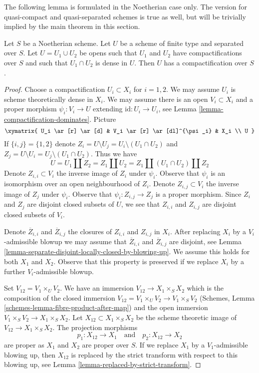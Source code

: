 \noindent
The following lemma is formulated in the Noetherian case only.
The version for quasi-compact and quasi-separated schemes is
true as well, but will be trivially implied by the main
theorem in this section.

\begin{lemma}
\label{lemma-two-compactifications}
Let $S$ be a Noetherian scheme. Let $U$ be a scheme of finite type
and separated over $S$. Let $U = U_1 \cup U_2$ be opens such that
$U_1$ and $U_2$ have compactifications over $S$ and such that
$U_1 \cap U_2$ is dense in $U$. Then $U$ has a compactification over $S$.
\end{lemma}

\begin{proof}
Choose a compactification $U_i \subset X_i$ for $i = 1, 2$. We may
assume $U_i$ is scheme theoretically dense in $X_i$. We may assume there
is an open $V_i \subset X_i$ and a proper morphism
$\psi_i : V_i \to U$ extending $\text{id} : U_i \to U_i$, see
Lemma \ref{lemma-compactification-dominates}. Picture
$$
\xymatrix{
U_i \ar[r] \ar[d] & V_i \ar[r] \ar[dl]^{\psi_i} & X_i \\
U
}
$$
If $\{i, j\} = \{1, 2\}$ denote
$Z_i = U \setminus U_j = U_i \setminus (U_1 \cap U_2)$
and
$Z_j = U \setminus U_i = U_j \setminus (U_1 \cap U_2)$.
Thus we have
$$
U = U_1 \amalg Z_2 = Z_1 \amalg U_2 = Z_1 \amalg (U_1 \cap U_2) \amalg Z_2
$$
Denote $Z_{i, i} \subset V_i$ the inverse image of $Z_i$ under $\psi_i$.
Observe that $\psi_i$ is an isomorphism over an open neighbourhood of $Z_i$.
Denote $Z_{i, j} \subset V_i$ the inverse image of $Z_j$ under $\psi_i$.
Observe that $\psi_i : Z_{i, j} \to Z_j$ is a proper morphism.
Since $Z_i$ and $Z_j$ are disjoint closed subsets of
$U$, we see that $Z_{i, i}$ and $Z_{i, j}$ are disjoint closed subsets
of $V_i$.

\medskip\noindent
Denote $\overline{Z}_{i, i}$ and $\overline{Z}_{i, j}$ the closures of
$Z_{i, i}$ and $Z_{i, j}$ in $X_i$. After replacing $X_i$ by a
$V_i$-admissible blowup we may assume that
$\overline{Z}_{i, i}$ and $\overline{Z}_{i, j}$ are disjoint, see
Lemma \ref{lemma-separate-disjoint-locally-closed-by-blowing-up}.
We assume this holds for both $X_1$ and $X_2$.
Observe that this property is preserved if we replace $X_i$
by a further $V_i$-admissible blowup.

\medskip\noindent
Set $V_{12} = V_1 \times_U V_2$. We have an immersion
$V_{12} \to X_1 \times_S X_2$ which is the composition of the closed
immersion $V_{12} = V_1 \times_U V_2 \to V_1 \times_S V_2$
(Schemes, Lemma \ref{schemes-lemma-fibre-product-after-map})
and the open immersion $V_1 \times_S V_2 \to X_1 \times_S X_2$.
Let $X_{12} \subset X_1 \times_S X_2$ be the scheme theoretic
image of $V_{12} \to X_1 \times_S X_2$. The projection morphisms
$$
p_1 : X_{12} \to X_1
\quad\text{and}\quad
p_2 : X_{12} \to X_2
$$
are proper as $X_1$ and $X_2$ are proper over $S$. If we replace $X_1$ by a
$V_1$-admissible blowing up, then $X_{12}$ is replaced by
the strict transform with respect to this blowing up, see
Lemma \ref{lemma-replaced-by-strict-transform}.


\end{proof}
